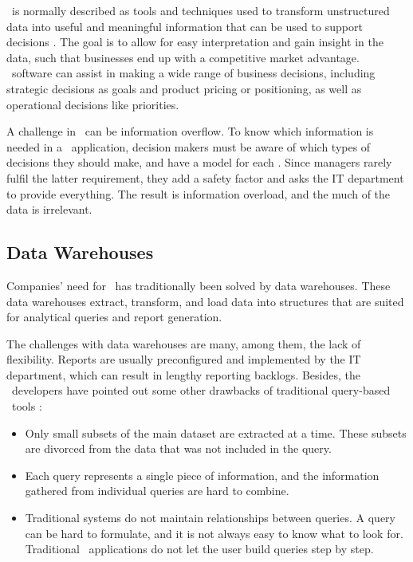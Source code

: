 \bi~is normally described as tools and techniques used to transform unstructured data into useful and meaningful information that can be used to support decisions \cite{Wikipedia_contributors2015-ag}. The goal is to allow for easy interpretation and gain insight in the data, such that businesses end up with a competitive market advantage. \bi~software can assist in making a wide range of business decisions, including strategic decisions as goals and product pricing or positioning, as well as operational decisions like priorities.

A challenge in \bi~can be information overflow. To know which information is needed in a \bi~application, decision makers must be aware of which types of decisions they should make, and have a model for each \cite{Ackoff1999-wk}. Since managers rarely fulfil the latter requirement, they add a safety factor and asks the IT department to provide everything. The result is information overload, and the much of the data is irrelevant. 

\subsection{Data Warehouses}
\label{sub:Data Warehouses}
Companies' need for \bi~has traditionally been solved by data warehouses. These data warehouses extract, transform, and load data into structures that are suited for analytical queries and report generation.

The challenges with data warehouses are many, among them, the lack of flexibility. Reports are usually preconfigured and implemented by the IT department, which can result in lengthy reporting backlogs. Besides, the \qlikview~developers have pointed out some other drawbacks of traditional query-based \bi~tools \cite{Qlik2010-ya}:
\begin{itemize}
  \item Only small subsets of the main dataset are extracted at a time. These subsets are divorced from the data that was not included in the query.
  \item Each query represents a single piece of information, and the information gathered from individual queries are hard to combine.
  \item Traditional systems do not maintain relationships between queries. A query can be hard to formulate, and it is not always easy to know what to look for. Traditional \bi~applications do not let the user build queries step by step.
\end{itemize}


